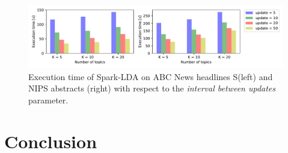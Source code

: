 \documentclass[journal]{IEEEtran}
\begin{document}
\begin{figure}[t]
\centering
\includegraphics[scale=0.6]{plots/param_update.pdf}
\caption{Execution time of Spark-LDA on ABC News headlines S(left) and NIPS abstracts (right) with respect to the \textit{interval between updates} parameter.}
\label{fig_sim}
\end{figure}



\section{Conclusion}
\label{sec:conclusion}




\end{document}
